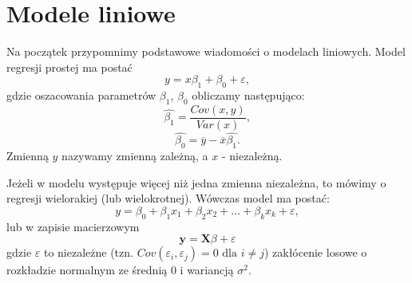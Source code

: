 \documentclass[12pt]{mwbk}
\theoremstyle{plain}
\theoremstyle{definition}
\theoremstyle{remark}
\newcommand{\yy}{\mathbf{y}}
\begin{document}
\section{Modele liniowe}
Na początek przypomnimy podstawowe wiadomości o modelach liniowych. Model regresji prostej ma postać $$y=x \beta_1+\beta_0 + \varepsilon,$$ gdzie oszacowania parametrów $\beta_1$, $\beta_0$ obliczamy następująco:
$$\hat{\beta_1}=\frac{Cov(x,y)}{Var(x)},$$
$$\hat{\beta_0}=\overline{y}-\overline{x}\hat{\beta_1}.$$ Zmienną $y$ nazywamy zmienną zależną, a $x$ - niezależną.

Jeżeli w modelu występuje więcej niż jedna zmienna niezależna, to mówimy o regresji wielorakiej (lub wielokrotnej). Wówczas model ma postać: $$y=\beta_0+\beta_1 x_1+\beta_2 x_2 + \ldots + \beta_k x_k + \varepsilon,$$ lub w zapisie macierzowym $$\yy=\mathbf{X}\beta+\varepsilon$$
gdzie $\varepsilon$ to niezależne (tzn. $Cov(\varepsilon_i, \varepsilon_j)=0 \text{ dla }i\neq j$) zakłócenie losowe o rozkładzie normalnym ze średnią 0 i wariancją $\sigma^2$.
\end{document}

